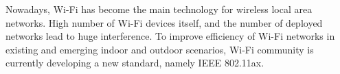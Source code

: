 \documentclass[conference]{IEEEtran}
\begin{document}


Nowadays, Wi-Fi has become the main technology for wireless local area networks. High number of Wi-Fi devices itself, and the number of deployed networks lead to huge interference. To improve efficiency of Wi-Fi networks in existing and emerging indoor and outdoor scenarios, Wi-Fi community is currently developing a new standard, namely IEEE 802.11ax. 
\end{document}
